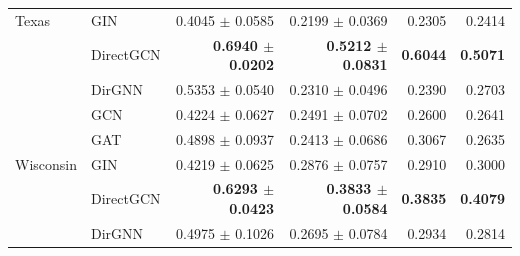 \documentclass[utf8]{FrontiersinHarvard}
\begin{document}
\begin{longtable}{llrrrr}
		Texas     & GIN       & 0.4045 $\pm$ 0.0585          & 0.2199 $\pm$ 0.0369          & 0.2305          & 0.2414          \\
		& DirectGCN & \textbf{0.6940 $\pm$ 0.0202} & \textbf{0.5212 $\pm$ 0.0831} & \textbf{0.6044} & \textbf{0.5071} \\
		& DirGNN    & 0.5353 $\pm$ 0.0540          & 0.2310 $\pm$ 0.0496          & 0.2390          & 0.2703          \\
		\midrule
		& GCN       & 0.4224 $\pm$ 0.0627          & 0.2491 $\pm$ 0.0702          & 0.2600          & 0.2641          \\
		& GAT       & 0.4898 $\pm$ 0.0937          & 0.2413 $\pm$ 0.0686          & 0.3067          & 0.2635          \\
		Wisconsin & GIN       & 0.4219 $\pm$ 0.0625          & 0.2876 $\pm$ 0.0757          & 0.2910          & 0.3000          \\
		& DirectGCN & \textbf{0.6293 $\pm$ 0.0423} & \textbf{0.3833 $\pm$ 0.0584} & \textbf{0.3835} & \textbf{0.4079} \\
		& DirGNN    & 0.4975 $\pm$ 0.1026          & 0.2695 $\pm$ 0.0784          & 0.2934          & 0.2814          \\
	\end{longtable}
	
\end{document}
